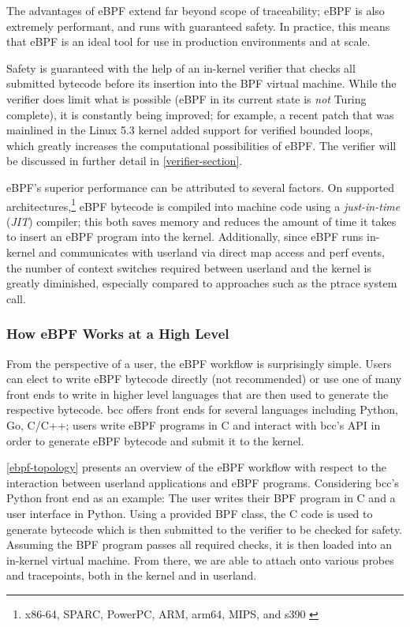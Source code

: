 \documentclass[
  12pt]{findlay}
\begin{document}
The advantages of eBPF extend far beyond scope of traceability; eBPF is
also extremely performant, and runs with guaranteed safety. In practice,
this means that eBPF is an ideal tool for use in production environments
and at scale.

Safety is guaranteed with the help of an in-kernel verifier that checks
all submitted bytecode before its insertion into the BPF virtual
machine. While the verifier does limit what is possible (eBPF in its
current state is \emph{not} Turing complete), it is constantly being
improved; for example, a recent patch \autocite{starovoitov19} that was
mainlined in the Linux 5.3 kernel added support for verified bounded
loops, which greatly increases the computational possibilities of eBPF.
The verifier will be discussed in further detail in
\autoref{verifier-section}.

eBPF's superior performance can be attributed to several factors. On
supported
architectures,\footnote{x86-64, SPARC, PowerPC, ARM, arm64, MIPS, and s390 \cite{fleming17}}
eBPF bytecode is compiled into machine code using a \emph{just-in-time}
(\emph{JIT}) compiler; this both saves memory and reduces the amount of
time it takes to insert an eBPF program into the kernel. Additionally,
since eBPF runs in-kernel and communicates with userland via direct map
access and perf events, the number of context switches required between
userland and the kernel is greatly diminished, especially compared to
approaches such as the ptrace system call.

\hypertarget{how-ebpf-works-at-a-high-level}{%
\subsubsection{How eBPF Works at a High
Level}\label{how-ebpf-works-at-a-high-level}}

From the perspective of a user, the eBPF workflow is surprisingly
simple. Users can elect to write eBPF bytecode directly (not
recommended) or use one of many front ends to write in higher level
languages that are then used to generate the respective bytecode. bcc
\autocite{bcc} offers front ends for several languages including Python,
Go, C/C++; users write eBPF programs in C and interact with bcc's API in
order to generate eBPF bytecode and submit it to the kernel.

\autoref{ebpf-topology} presents an overview of the eBPF workflow with
respect to the interaction between userland applications and eBPF
programs. Considering bcc's Python front end as an example: The user
writes their BPF program in C and a user interface in Python. Using a
provided BPF class, the C code is used to generate bytecode which is
then submitted to the verifier to be checked for safety. Assuming the
BPF program passes all required checks, it is then loaded into an
in-kernel virtual machine. From there, we are able to attach onto
various probes and tracepoints, both in the kernel and in userland.
\end{document}
